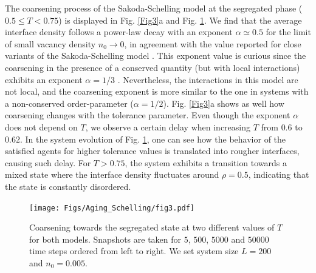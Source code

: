 The coarsening process of the Sakoda-Schelling model at the segregated phase ($0.5 \le T < 0.75$) is displayed in Fig. \ref{Fig3}a and Fig. \ref{Fig4}. We find that the average interface density follows a power-law decay with an exponent $\alpha \simeq 0.5$ for the limit of small vacancy density $n_0 \to 0$, in agreement with the value reported for close variants of the Sakoda-Schelling model \cite{Dall_Asta_2008}. This exponent value is curious since the coarsening in the presence of a conserved quantity (but with local interactions) exhibits an exponent $\alpha = 1/3$ \cite{Maxi}. Nevertheless, the interactions in this model are not local, and the coarsening exponent is more similar to the one in systems with a non-conserved order-parameter ($\alpha = 1/2$). Fig. \ref{Fig3}a shows as well how coarsening changes with the tolerance parameter. Even though the exponent $\alpha$ does not depend on $T$, we observe a certain delay when increasing $T$ from $0.6$ to $0.62$. In the system evolution of Fig. \ref{Fig4}, one can see how the behavior of the satisfied agents for higher tolerance values is translated into rougher interfaces, causing such delay. For $T > 0.75$, the system exhibits a transition towards a mixed state where the interface density fluctuates around $\rho = 0.5$, indicating that the state is constantly disordered.

\begin{figure}[ht]
\centering \captionsetup{font=sf}
\texttt{[image: Figs/Aging\_Schelling/fig3.pdf]} 
\caption[Coarsening towards the segregated state]{Coarsening towards the segregated state at two different values of $T$ for both models. Snapshots are taken for $5$, $500$, $5000$ and $50000$ time steps ordered from left to right. We set system size $L = 200$ and $n_0 = 0.005$.}
\label{Fig4}
\end{figure}


